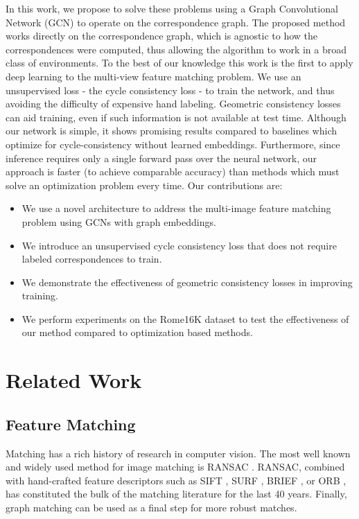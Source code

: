 \documentclass[10pt,twocolumn,letterpaper]{article}
\begin{document}
In this work, we propose to solve these problems using a Graph Convolutional Network (GCN) to operate on the correspondence graph.
The proposed method works directly on the correspondence graph, which is agnostic to how the correspondences were computed, thus allowing the algorithm to work in a broad class of environments.
To the best of our knowledge this work is the first to apply deep learning to the multi-view feature matching problem.
We use an unsupervised loss - the cycle consistency loss - to train the network, and thus avoiding the difficulty of expensive hand labeling.
Geometric consistency losses can aid training, even if such information is not available at test time.
Although our network is simple, it shows promising results compared to baselines which optimize for cycle-consistency without learned embeddings.
Furthermore, since inference requires only a single forward pass over the neural network, our approach is faster (to achieve comparable accuracy) than methods which must solve an optimization problem every time.
Our contributions are:
\begin{itemize}
\item We use a novel architecture to address the multi-image feature matching problem using GCNs with graph embeddings.
\item We introduce an unsupervised cycle consistency loss that does not require labeled correspondences to train.
\item We demonstrate the effectiveness of geometric consistency losses in improving training.
\item We perform experiments on the Rome16K \cite{li2010location} dataset to test the effectiveness of our method compared to optimization based methods.
\end{itemize}


\section{Related Work}

\subsection{Feature Matching}
Matching has a rich history of research in computer vision.
The most well known and widely used method for image matching is RANSAC \cite{fischler1981random}.
RANSAC, combined with hand-crafted feature descriptors such as SIFT \cite{lowe2004distinctive}, SURF \cite{bay2006surf}, BRIEF \cite{calonder2012brief}, or ORB \cite{mur2015orb}, has constituted the bulk of the matching literature for the last 40 years.
Finally, graph matching \cite{suh2015subgraph, hu2016distributable} can be used as a final step for more robust matches.
\end{document}
